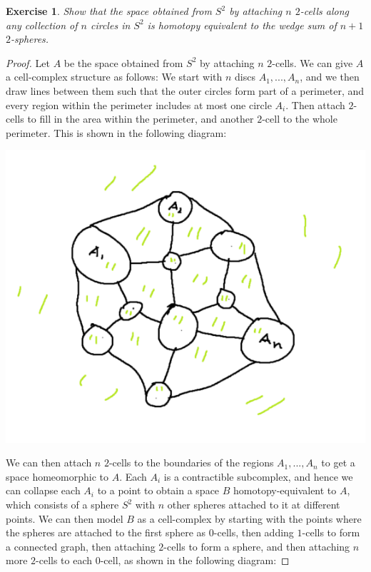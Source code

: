\documentclass{article}
\newtheorem{exercise}[theorem]{Exercise}
\begin{document}
\begin{exercise}
Show that the space obtained from $S^2$ by attaching $n$ $2$-cells along any collection of $n$ circles in $S^2$ is homotopy equivalent to the wedge sum of $n+1$ $2$-spheres.
\end{exercise}
\begin{proof}
Let $A$ be the space obtained from $S^2$ by attaching $n$ $2$-cells. We can give $A$ a cell-complex structure as follows: We start with $n$ discs $A_1,...,A_n$, and we then draw lines between them such that the outer circles form part of a perimeter, and every region within the perimeter includes at most one circle $A_i$. Then attach $2$-cells to fill in the area within the perimeter, and another $2$-cell to the whole perimeter. This is shown in the following diagram: 

\includegraphics[scale=0.5]{Screenshot (1351).png}


We can then attach $n$ $2$-cells to the boundaries of the regions $A_1,...,A_n$ to get a space homeomorphic to $A$. Each $A_i$ is a contractible subcomplex, and hence we can collapse each $A_i$ to a point to obtain a space $B$ homotopy-equivalent to $A$, which consists of a sphere $S^2$ with $n$ other spheres attached to it at different points. We can then model $B$ as a cell-complex by starting with the points where the spheres are attached to the first sphere as $0$-cells, then adding $1$-cells to form a connected graph, then attaching $2$-cells to form a sphere, and then attaching $n$ more $2$-cells to each $0$-cell, as shown in the following diagram:


\end{proof}
\end{document}
